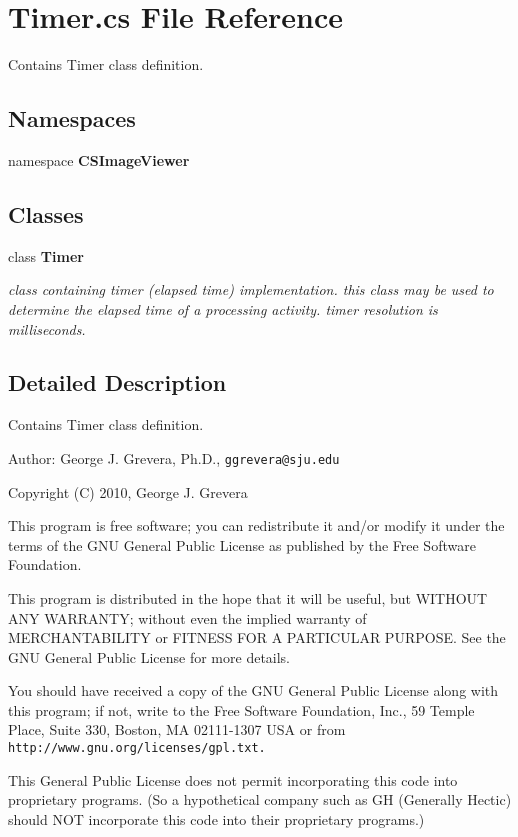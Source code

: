 \section{Timer.cs File Reference}
\label{_timer_8cs}
Contains Timer class definition. 

\subsection*{Namespaces}
\begin{CompactItemize}
\item 
namespace {\bf CSImage\-Viewer}
\end{CompactItemize}
\subsection*{Classes}
\begin{CompactItemize}
\item 
class {\bf Timer}
\begin{CompactList}\small\item\em class containing timer (elapsed time) implementation. this class may be used to determine the elapsed time of a processing activity. timer resolution is milliseconds. \item\end{CompactList}\end{CompactItemize}


\subsection{Detailed Description}
Contains Timer class definition. 

\begin{Desc}
\item[Author:]George J. Grevera, Ph.D., {\tt ggrevera@sju.edu}\end{Desc}
Copyright (C) 2010, George J. Grevera

This program is free software; you can redistribute it and/or modify it under the terms of the GNU General Public License as published by the Free Software Foundation.

This program is distributed in the hope that it will be useful, but WITHOUT ANY WARRANTY; without even the implied warranty of MERCHANTABILITY or FITNESS FOR A PARTICULAR PURPOSE. See the GNU General Public License for more details.

You should have received a copy of the GNU General Public License along with this program; if not, write to the Free Software Foundation, Inc., 59 Temple Place, Suite 330, Boston, MA 02111-1307 USA or from {\tt http://www.gnu.org/licenses/gpl.txt.}

This General Public License does not permit incorporating this code into proprietary programs. (So a hypothetical company such as GH (Generally Hectic) should NOT incorporate this code into their proprietary programs.) 